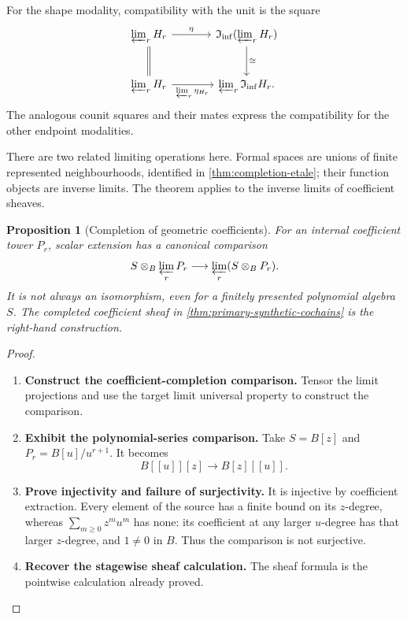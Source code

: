\documentclass[11pt,a4paper]{article}
\numberwithin{algorithm}{section}
\numberwithin{equation}{section}
\newtheorem{proposition}[proposition]{Proposition}
\theoremstyle{definition}
\theoremstyle{remark}
\theoremstyle{plain}
\newcommand{\InfShape}{\mathfrak I_{\mathrm{inf}}}
\theoremstyle{definition}
\theoremstyle{plain}
\begin{document}
For the shape modality, compatibility with the unit is the square
\[
\begin{tikzcd}[column sep=large,row sep=large]
 \varprojlim_r H_r \arrow[r,"{\eta}"] \arrow[d,equal]
   & \InfShape(\varprojlim_rH_r) \arrow[d,"{\cong}"]\\
 \varprojlim_r H_r \arrow[r,"{{\varprojlim_r\eta_{H_r}}}"']
   & \varprojlim_r\InfShape H_r .
\end{tikzcd}
\]
The analogous counit squares and their mates express the compatibility
for the other endpoint modalities.


There are two related limiting operations here. Formal spaces are
unions of finite represented neighbourhoods, identified in
\cref{thm:completion-etale}; their function objects are inverse
limits. The theorem applies to the inverse limits of coefficient sheaves.

\begin{proposition}[Completion of geometric coefficients]
\label{prop:geometric-coefficient-completion}
For an internal coefficient tower $P_r$, scalar extension has a
canonical comparison
\[
 S\otimes_B\varprojlim_rP_r
 \longrightarrow\varprojlim_r(S\otimes_BP_r).
\]
It is not always an isomorphism, even for a finitely presented
polynomial algebra $S$.  The completed coefficient sheaf in
\cref{thm:primary-synthetic-cochains} is the right-hand construction.
\end{proposition}
\begin{proof}\leavevmode
\begin{enumerate}[leftmargin=*,align=left]
\item \textbf{Construct the coefficient-completion comparison.}
Tensor the limit projections and use the target limit universal
property to construct the comparison.

\item \textbf{Exhibit the polynomial-series comparison.}
Take $S=B[z]$ and
$P_r=B[u]/u^{r+1}$.  It becomes
\[
 B[[u]][z]\longrightarrow B[z][[u]].
\]

\item \textbf{Prove injectivity and failure of surjectivity.}
It is injective by coefficient extraction.  Every element of the
source has a finite bound on its $z$-degree, whereas
$\sum_{m\ge0}z^mu^m$ has none: its coefficient at any larger
$u$-degree has that larger $z$-degree, and $1\ne0$ in $B$.
Thus the comparison is not surjective.

\item \textbf{Recover the stagewise sheaf calculation.}
The sheaf formula is the pointwise calculation already proved.
\end{enumerate}
\end{proof}
\end{document}
